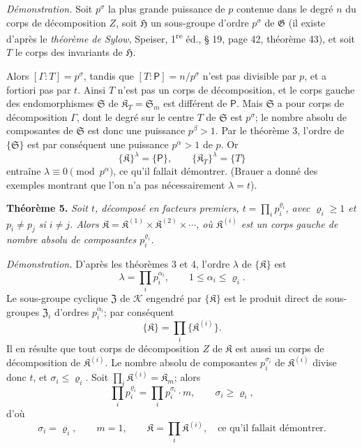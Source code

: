 \emph{Démonstration.} Soit \(p^\sigma\) la plus grande puissance de \(p\) contenue dans le degré \(n\) du corps de décomposition \(Z\), soit \(\mathfrak H\) un sous-groupe d'ordre \(p^\sigma\) de \(\mathfrak G\) (il existe d'après le \emph{théorème de Sylow}, Speiser, 1\textsuperscript{re} éd., \S{} 19, page 42, théorème 43), et soit \(T\) le corps des invariants de \(\mathfrak H\).

Alors \([\Gamma:T]=p^\sigma\), tandis que \([T:\mathsf P]=n/p^\sigma\) n'est pas divisible par \(p\), et a fortiori pas par \(t\). Ainsi \(T\) n'est pas un corps de décomposition, et le corps gauche des endomorphismes \(\mathfrak S\) de \(\mathfrak K_T=\mathfrak S_m\) est différent de \(\mathsf P\). Mais \(\mathfrak S\) a pour corps de décomposition \(\Gamma\), dont le degré sur le centre \(T\) de \(\mathfrak S\) est \(p^\sigma\); le nombre absolu de composantes de \(\mathfrak S\) est donc une puissance \(p^\beta>1\). Par le théorème 3, l'ordre de \(\{\mathfrak S\}\) est par conséquent une puissance \(p^\alpha>1\) de \(p\). Or
\[
\{\mathfrak K\}^{\lambda}=\{\mathsf P\},
\qquad
\{\mathfrak K_T\}^{\lambda}=\{T\}
\]
entraîne \(\lambda\equiv0\pmod {p^\alpha}\), ce qu'il fallait démontrer. (Brauer a donné des exemples montrant que l'on n'a pas nécessairement \(\lambda=t\)).

\textbf{Théorème 5.} \emph{Soit \(t\), décomposé en facteurs premiers, \(t=\prod_i p_i^{\varrho_i}\), avec \(\varrho_i\ge1\) et \(p_i\ne p_j\) si \(i\ne j\). Alors \(\mathfrak K=\mathfrak K^{(1)}\times\mathfrak K^{(2)}\times\cdots\), où \(\mathfrak K^{(i)}\) est un corps gauche de nombre absolu de composantes \(p_i^{\varrho_i}\).}

\emph{Démonstration.} D'après les théorèmes 3 et 4, l'ordre \(\lambda\) de \(\{\mathfrak K\}\) est
\[
\lambda=\prod_i p_i^{\alpha_i},\qquad 1\le\alpha_i\le\varrho_i.
\]
Le sous-groupe cyclique \(\mathfrak Z\) de \(\mathscr K\) engendré par \(\{\mathfrak K\}\) est le produit direct de sous-groupes \(\mathfrak Z_i\) d'ordres \(p_i^{\alpha_i}\); par conséquent
\[
\{\mathfrak K\}=\prod_i\{\mathfrak K^{(i)}\}.
\]
Il en résulte que tout corps de décomposition \(Z\) de \(\mathfrak K\) est aussi un corps de décomposition de \(\mathfrak K^{(i)}\). Le nombre absolu de composantes \(p_i^{\sigma_i}\) de \(\mathfrak K^{(i)}\) divise donc \(t\), et \(\sigma_i\le\varrho_i\). Soit \(\prod_i \mathfrak K^{(i)}=\mathfrak K_m\); alors
\[
\prod_i p_i^{\varrho_i}=\prod_i p_i^{\sigma_i}\cdot m,
\qquad
\sigma_i\ge\varrho_i,
\]
d'où
\[
\sigma_i=\varrho_i,\qquad m=1,\qquad
\mathfrak K=\prod_i \mathfrak K^{(i)},
\quad\text{ce qu'il fallait démontrer.}
\]

